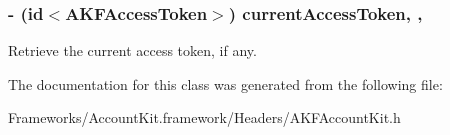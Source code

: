 \subsubsection[{current\+Access\+Token}]{\setlength{\rightskip}{0pt plus 5cm}-\/ (id$<${\bf A\+K\+F\+Access\+Token}$>$) current\+Access\+Token\hspace{0.3cm}{\ttfamily [read]}, {\ttfamily [nonatomic]}, {\ttfamily [copy]}}\label{interface_a_k_f_account_kit_a8c8f98feac16993dc66e75f33d23a561}
Retrieve the current access token, if any. 

The documentation for this class was generated from the following file\+:\begin{DoxyCompactItemize}
\item 
Frameworks/\+Account\+Kit.\+framework/\+Headers/A\+K\+F\+Account\+Kit.\+h\end{DoxyCompactItemize}
